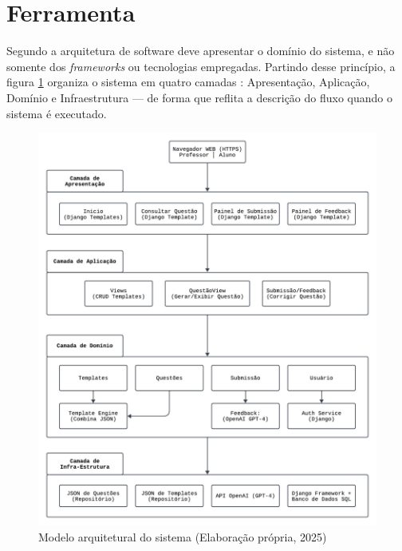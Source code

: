 \section{Ferramenta}

Segundo \parencite{martin2017} a arquitetura de software deve apresentar o domínio do sistema, e não somente dos \textit{frameworks} ou tecnologias empregadas. Partindo desse princípio, a figura \ref{fig:modelo-arquitetural} organiza o sistema em quatro camadas : Apresentação, Aplicação, Domínio e Infraestrutura — de forma que reflita a descrição do fluxo quando o sistema é executado.

\begin{figure}[ht]
	\centering
	\includegraphics[width=12cm]{./imagens/capitulo7/modelo-arquitetural}
	\caption{Modelo arquitetural do sistema (Elaboração própria, 2025) }
	\label{fig:modelo-arquitetural}
\end{figure}




